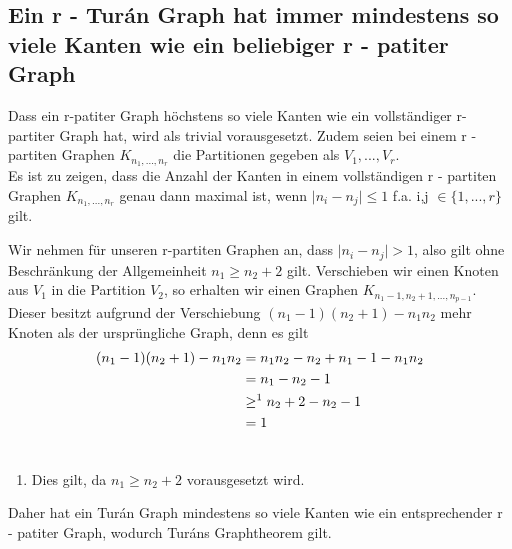 \documentclass[12pt, a4paper]{article}
\begin{document}
\subsection{Ein r - Turán Graph hat immer mindestens so viele Kanten wie ein beliebiger  r - patiter Graph}
Dass ein r-patiter Graph höchstens so viele Kanten wie ein vollständiger r-partiter Graph hat, wird als trivial vorausgesetzt. Zudem seien bei einem r - partiten Graphen $K_{n_1,...,n_r}$  die Partitionen gegeben als $V_1, ..., V_r$. \\
Es ist zu zeigen, dass die Anzahl der Kanten in einem vollständigen r - partiten Graphen $K_{n_1,...,n_r}$ genau dann maximal ist, wenn $\mid n_i - n_j \mid \le 1$ f.a. i,j $\in \{1, ...,  r \}$ gilt.

Wir nehmen für unseren r-partiten Graphen an, dass $\mid n_i - n_j \mid > 1$, also gilt ohne Beschränkung der Allgemeinheit $n_1 \ge n_2 + 2$ gilt.
Verschieben wir einen Knoten aus $V_1$ in die Partition $V_2$, so erhalten wir einen Graphen $K_{n_1 - 1, n_2 + 1,...,n_{p - 1}}$. Dieser besitzt aufgrund der Verschiebung $(n_1 - 1)(n_2 + 1) - n_1 n_2$ mehr Knoten als der ursprüngliche Graph, denn es gilt
\begin{gather}
\begin{split}(n_1 - 1)(n_2 + 1) - n_1 n_2 &= n_1 n_2 - n_2 + n_1 - 1 - n_1 n_2 \\
&= n_1 - n_2 - 1 \\
&\ge^1 n_2 + 2 - n_2 - 1 \\
&= 1\end{split}\notag\\\begin{split}\end{split}\notag
\end{gather}\begin{enumerate}
\item {}
Dies gilt, da $n_1 \ge n_2 + 2$ vorausgesetzt wird.

\end{enumerate}

Daher hat ein Turán Graph mindestens so viele Kanten wie ein entsprechender r - patiter Graph, wodurch Turáns Graphtheorem gilt.
\end{document}
